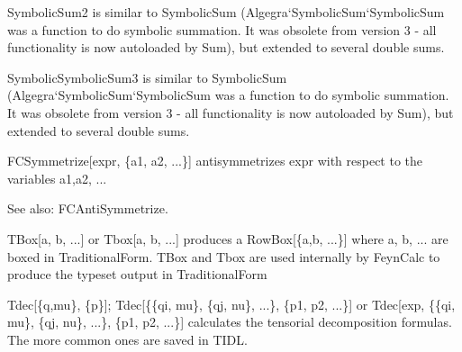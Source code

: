 

SymbolicSum2 is similar to SymbolicSum (Algegra`SymbolicSum`SymbolicSum was a function to do symbolic summation. It was obsolete from
  version 3 - all functionality is now autoloaded by Sum), but extended to several double sums.



SymbolicSymbolicSum3 is similar to SymbolicSum (Algegra`SymbolicSum`SymbolicSum was a function to do symbolic summation. It was obsolete
  from version 3 - all functionality is now autoloaded by Sum), but extended to several double sums.



FCSymmetrize[expr, \{a1, a2, ...\}] antisymmetrizes expr with respect to the variables a1,a2, ...

See also: FCAntiSymmetrize.








TBox[a, b, ...] or Tbox[a, b, ...] produces a RowBox[\{a,b, ...\}] where a, b, ... are boxed in TraditionalForm. TBox and Tbox are used
  internally by FeynCalc to produce the typeset output in TraditionalForm



Tdec[\{q,mu\}, \{p\}]; Tdec[\{\{qi, mu\}, \{qj, nu\}, ...\}, \{p1, p2, ...\}] or Tdec[exp, \{\{qi, mu\}, \{qj, nu\}, ...\}, \{p1, p2,
  ...\}] calculates the tensorial decomposition formulas. The more common ones are saved in TIDL.


